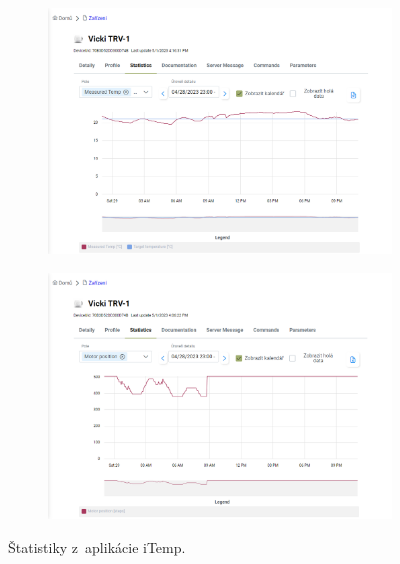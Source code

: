 \begin{figure}[H]
    \centering
    \begin{subfigure}[b]{\textwidth}
        \includegraphics[width=\textwidth]{obrazky-figures/iTempStatisticTemp.png}
    \end{subfigure}
    \begin{subfigure}[b]{\textwidth}
        \includegraphics[width=\textwidth]{obrazky-figures/iTempStatisticPosition.png}
    \end{subfigure}
    \caption{Štatistiky z~aplikácie iTemp.}
    \label{fig:test_itempStat}
\end{figure}

